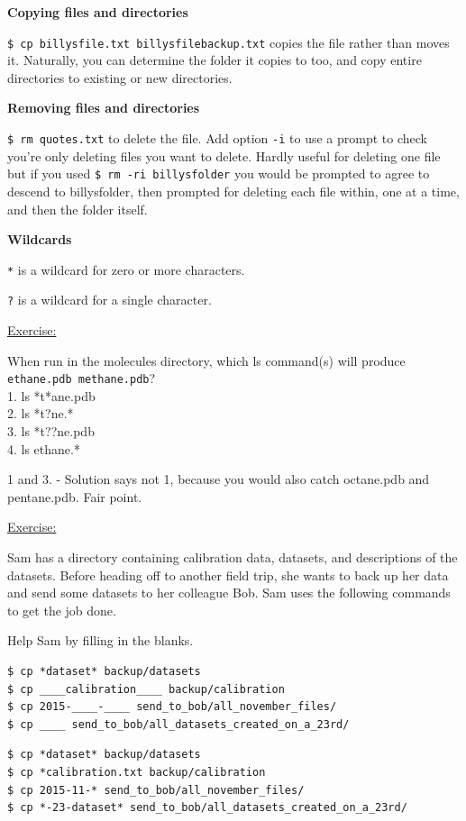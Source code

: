 \documentclass[12pt]{article}
\begin{document}
\vspace{1em}
\textbf{Copying files and directories}

\texttt{\$ cp billysfile.txt billysfilebackup.txt} copies the file rather than moves it. Naturally, you can determine the folder it copies to too, and copy entire directories to existing or new directories.

\textbf{Removing files and directories}

\texttt{\$ rm quotes.txt} to delete the file. Add option \texttt{-i} to use a prompt to check you're only deleting files you want to delete. Hardly useful for deleting one file but if you used \texttt{\$ rm -ri billysfolder} you would be prompted to agree to descend to billysfolder, then prompted for deleting each file within, one at a time, and then the folder itself.

\textbf{Wildcards}

\texttt{*} is a wildcard for zero or more characters.

\texttt{?} is a wildcard for a single character. 

\begin{addmargin}[1cm]{0cm}
\color{gray}
\vspace{1em}\underline{Exercise:}

When run in the molecules directory, which ls command(s) will produce 
\\\texttt{ethane.pdb methane.pdb}?
\\1. ls *t*ane.pdb
\\2. ls *t?ne.*
\\3. ls *t??ne.pdb
\\4. ls ethane.*
\color{black}

1 and 3. - Solution says not 1, because you would also catch octane.pdb and pentane.pdb. Fair point.

\color{gray}
\vspace{1em}\underline{Exercise:}

Sam has a directory containing calibration data, datasets, and descriptions of the datasets. Before heading off to another field trip, she wants to back up her data and send some datasets to her colleague Bob. Sam uses the following commands to get the job done.

Help Sam by filling in the blanks.
\begin{verbatim}
$ cp *dataset* backup/datasets
$ cp ____calibration____ backup/calibration
$ cp 2015-____-____ send_to_bob/all_november_files/
$ cp ____ send_to_bob/all_datasets_created_on_a_23rd/
\end{verbatim}

\color{black}
\begin{verbatim}
$ cp *dataset* backup/datasets
$ cp *calibration.txt backup/calibration
$ cp 2015-11-* send_to_bob/all_november_files/
$ cp *-23-dataset* send_to_bob/all_datasets_created_on_a_23rd/  
\end{verbatim}
\end{addmargin}
\end{document}
